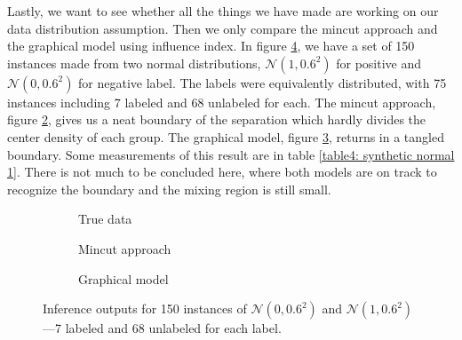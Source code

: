 Lastly, we want to see whether all the things we have made are working on our data distribution assumption. Then we only compare the mincut approach and the graphical model using influence index. In figure \ref{fig4: synthetic data: normal distribution 1}, we have a set of 150 instances made from two normal distributions, $\mathcal{N}(1, 0.6^2)$ for positive and $\mathcal{N}(0, 0.6^2)$ for negative label. The labels were equivalently distributed, with 75 instances including 7 labeled and 68 unlabeled for each. The mincut approach, figure \ref{fig4b: synthetic data: normal distribution 1}, gives us a neat boundary of the separation which hardly divides the center density of each group. The graphical model, figure \ref{fig4c: synthetic data: normal distribution 1}, returns in a tangled boundary. Some measurements of this result are in table \ref{table4: synthetic normal 1}. There is not much to be concluded here, where both models are on track to recognize the boundary and the mixing region is still small.

\begin{figure}[ht!]
	\centering
	\captionsetup[subfigure]{justification=centering}
	\begin{subfigure}[b]{0.31\textwidth}
		\centering
		
		\caption{True data}
		\label{fig4a: synthetic data: normal distribution 1}
	\end{subfigure}
	\hfill
	\begin{subfigure}[b]{0.31\textwidth}
		\centering
		
		\caption{Mincut approach}
		\label{fig4b: synthetic data: normal distribution 1}
	\end{subfigure}
	\hfill
	\begin{subfigure}[b]{0.31\textwidth}
		\centering
		
		\caption{Graphical model}
		\label{fig4c: synthetic data: normal distribution 1}
	\end{subfigure}
	\caption[Inference outputs on $\mathcal{N}(0, 0.6^2)$ and $\mathcal{N}(1, 0.6^2)$.]{Inference outputs for 150 instances of $\mathcal{N}(0, 0.6^2)$ and $\mathcal{N}(1, 0.6^2)$---7 labeled and 68 unlabeled for each label.}
	\label{fig4: synthetic data: normal distribution 1}
\end{figure}

